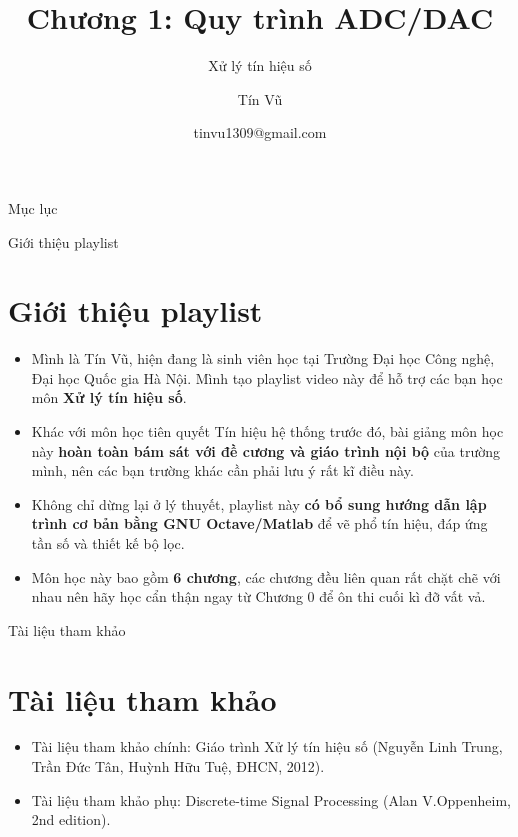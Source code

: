 \documentclass[8pt]{beamer}
\title[Chương 1: Quy trình ADC/DAC] %
{Chương 1: Quy trình ADC/DAC}
\subtitle{Xử lý tín hiệu số}
\author[Xử lý tín hiệu số] %
{Tín Vũ}
\date[VLC 2021] %
{tinvu1309@gmail.com}
\begin{document}
\frame{\titlepage}
\begin{frame}{Mục lục}
\tableofcontents
\end{frame}
\begin{frame}{Giới thiệu playlist}
\section{Giới thiệu playlist}
	\begin{itemize}
		\item Mình là Tín Vũ, hiện đang là sinh viên học tại Trường Đại học Công nghệ, Đại học Quốc gia Hà Nội. Mình tạo playlist video này để hỗ trợ các bạn học môn \textbf{Xử lý tín hiệu số}.
\item Khác với môn học tiên quyết \alert{Tín hiệu hệ thống} trước đó, bài giảng môn học này \textbf{hoàn toàn bám sát với đề cương và giáo trình nội bộ} của trường mình, nên các bạn trường khác cần phải lưu ý rất kĩ điều này.
\item Không chỉ dừng lại ở lý thuyết, playlist này \textbf{có bổ sung hướng dẫn lập trình cơ bản bằng GNU Octave/Matlab} để vẽ phổ tín hiệu, đáp ứng tần số và thiết kế bộ lọc.
\item Môn học này bao gồm \textbf{6 chương}, các chương đều liên quan rất chặt chẽ với nhau nên hãy học cẩn thận ngay từ \alert{Chương 0} để ôn thi cuối kì đỡ vất vả.
	\end{itemize}
\end{frame}
\begin{frame}{Tài liệu tham khảo}
\section{Tài liệu tham khảo}
\begin{itemize}
		\item Tài liệu tham khảo chính: Giáo trình Xử lý tín hiệu số (Nguyễn Linh Trung, Trần Đức Tân, Huỳnh Hữu Tuệ, ĐHCN, 2012).
		\item Tài liệu tham khảo phụ: Discrete-time Signal Processing (Alan V.Oppenheim, 2nd edition). 
	\end{itemize}
\end{frame}
\end{document}
